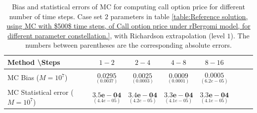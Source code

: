 \begin{table}[h!]
	\centering
	\begin{tabular}{l*{6}{c}r}
		Method \textbackslash  Steps            & $1-2$ & $2-4$ & $4-8$ & $8-16$  \\
		\hline
		MC Bias ($M=10^7$)  &$\underset{(  0.0037
			)}{\mathbf{0.0295}}$  & $\underset{( 0.0003)}{\mathbf{0.0025}}$  & $\underset{(   0.0001)}{\mathbf{0.0009}}$  & $\underset{(  6.2e-05)}{\mathbf{0.0005}}$ \\	
		
		MC Statistical error ($M=10^7$)   & $\underset{(  4.4e-05)}{\mathbf{3.5e-04}}$  & $\underset{(   4.2e-05)}{\mathbf{3.4e-04}}$  & $\underset{(  4.1e-05)}{\mathbf{3.3e-04}}$ & $\underset{(  4.1e-05)}{\mathbf{3.3e-04}}$ \\	
	
		\hline
	\end{tabular}
	\caption{Bias and statistical errors of MC   for computing call option price  for different number of time steps. Case set $2$ parameters in table \ref{table:Reference solution, using MC with $500$ time steps, of Call option price under rBergomi model, for different parameter constellation.}, with Richardson extrapolation (level $1$). The numbers between parentheses are the corresponding absolute errors.}
	\label{Bias and Statistical errors of MC ($M=10^7$)  for computing Call option price  for different number of time steps. Case set $3$ parameters, with Richardson extrapolation (level1). The numbers between parentheses are the corresponding absolute errors.}
\end{table}



\FloatBarrier





